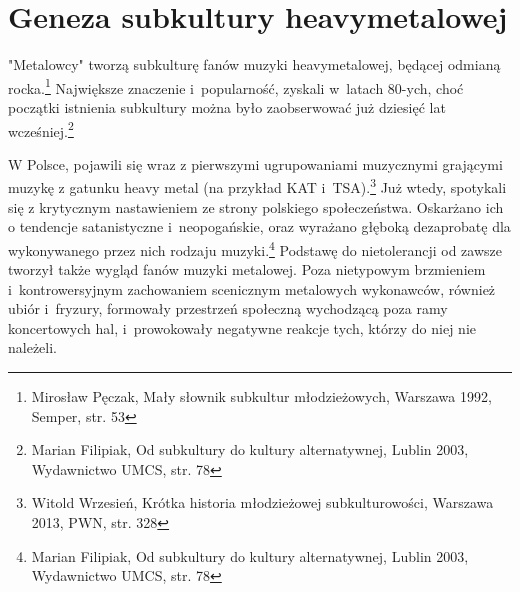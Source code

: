 \documentclass[12pt, a4paper, titlepage]{report}
\begin{document}



\section{Geneza subkultury heavymetalowej}
"Metalowcy" tworzą subkulturę fanów muzyki heavymetalowej, będącej odmianą rocka.\footnote{Mirosław Pęczak, Mały słownik subkultur młodzieżowych, Warszawa 1992, Semper, str. 53}  Największe znaczenie i~popularność, zyskali w~latach 80-ych, choć początki istnienia subkultury można było zaobserwować już dziesięć lat wcześniej.\footnote{Marian Filipiak, Od subkultury do kultury alternatywnej, Lublin 2003, Wydawnictwo UMCS, str. 78} 

W Polsce, pojawili się wraz z pierwszymi ugrupowaniami muzycznymi grającymi muzykę z gatunku heavy metal (na przykład KAT i~TSA).\footnote{Witold Wrzesień, Krótka historia młodzieżowej subkulturowości, Warszawa 2013, PWN, str. 328} Już wtedy, spotykali się z krytycznym nastawieniem ze strony polskiego społeczeństwa. Oskarżano ich o tendencje satanistyczne i~neopogańskie, oraz wyrażano głęboką dezaprobatę dla wykonywanego przez nich rodzaju muzyki.\footnote{Marian Filipiak, Od subkultury do kultury alternatywnej, Lublin 2003, Wydawnictwo UMCS, str. 78} %
Podstawę do nietolerancji od zawsze tworzył także wygląd fanów muzyki metalowej. Poza nietypowym brzmieniem i~kontrowersyjnym zachowaniem scenicznym metalowych wykonawców, również ubiór i~fryzury, formowały przestrzeń społeczną wychodzącą poza ramy koncertowych hal, i~prowokowały negatywne reakcje tych, którzy do niej nie należeli. 
 
\end{document}
